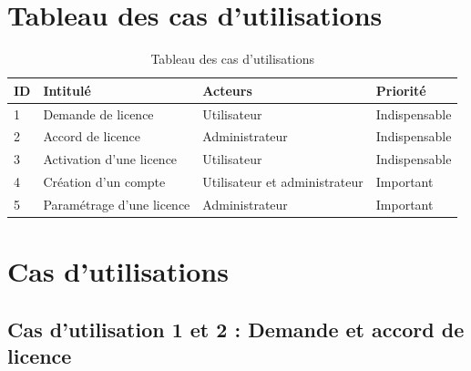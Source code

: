 \section{Tableau des cas d'utilisations}

\begin{table}[h]
	\centering
	\begin{tabular}{ | m{0.6cm} | m{6cm} | m{6cm}| m{3cm} | } 
                \hline
		\textbf{ID} & \textbf{Intitulé} & \textbf{Acteurs} & \textbf{Priorité} \\
                \hline
			1 & Demande de licence & Utilisateur & Indispensable \\
                \hline
			2 & Accord de licence & Administrateur & Indispensable \\
                \hline
			3 & Activation d'une licence & Utilisateur & Indispensable \\
		\hline
			4 & Création d'un compte & Utilisateur et administrateur & Important \\
		\hline
			5 & Paramétrage d'une licence & Administrateur & Important \\
		\hline
        \end{tabular}
	\caption{Tableau des cas d'utilisations}
	\label{tab:tab1}
\end{table}
\newpage

\section{Cas d'utilisations}

\subsection{Cas d'utilisation 1 et 2 : Demande et accord de licence}

